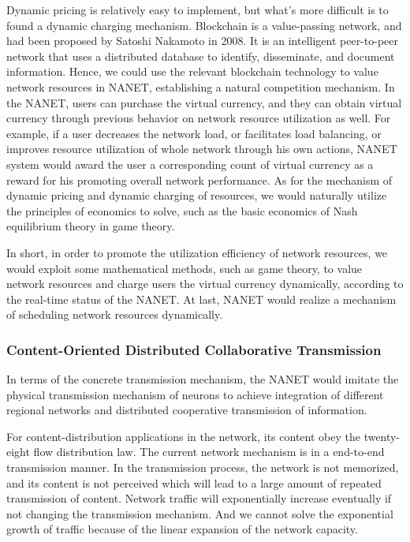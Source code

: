 \documentclass[journal,comsoc]{IEEEtran}
\begin{document}
				Dynamic pricing is relatively easy to implement, but what's more difficult is to found a dynamic charging mechanism.
				Blockchain is a value-passing network, and had been proposed by Satoshi Nakamoto in 2008\cite{nakamoto2008bitcoin}. 
				It is an intelligent peer-to-peer network that uses a distributed database to identify, disseminate, and document information. 
				Hence, we could use the relevant blockchain technology to value network resources in NANET, establishing a natural competition mechanism.
				In the NANET, users can purchase the virtual currency, and they can obtain virtual currency through previous behavior on network resource utilization as well.
				For example, if a user decreases the network load, or facilitates load balancing, or improves resource utilization of whole network through his own actions, 
				NANET system would award the user a corresponding count of virtual currency as a reward for his promoting overall network performance. 
				As for the mechanism of dynamic pricing and dynamic charging of resources, 
				we would naturally utilize the principles of economics to solve, such as the basic economics of Nash equilibrium theory in game theory\cite{gibbons1992primer}\cite{nash1951non}.
				
				In short, in order to promote the utilization efficiency of network resources, 
				we would exploit some mathematical methods, such as game theory, to value network resources and charge users the virtual currency dynamically, according to the real-time status of the NANET.
				At last, NANET would realize a mechanism of scheduling network resources dynamically.
			
			\subsubsection{Content-Oriented Distributed Collaborative Transmission}
			
				In terms of the concrete transmission mechanism, the NANET would imitate the physical transmission mechanism of neurons 
				to achieve integration of different regional networks and distributed cooperative transmission of information.
				
				For content-distribution applications in the network, its content obey the twenty-eight flow distribution law.
				The current network mechanism is in a end-to-end transmission manner. 
				In the transmission process, the network is not memorized, and its content is not perceived which will lead to a large amount of repeated transmission of content.
				Network traffic will exponentially increase eventually if not changing the transmission mechanism. 
				And we cannot solve the exponential growth of traffic because of the linear expansion of the network capacity.
				
\end{document}

